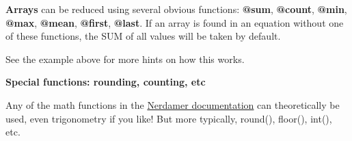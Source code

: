 \textbf{Arrays} can be reduced using several obvious functions:
\textbf{@sum}, \textbf{@count}, \textbf{@min}, \textbf{@max},
\textbf{@mean}, \textbf{@first}, \textbf{@last}. If an array is found in
an equation without one of these functions, the SUM of all values will
be taken by default.

See the example above for more hints on how this works.

\textbf{Special functions: rounding, counting, etc}

Any of the math functions in the
\href{https://nerdamer.com/documentation.html}{Nerdamer documentation}
can theoretically be used, even trigonometry if you like! But more
typically, round(), floor(), int(), etc.
